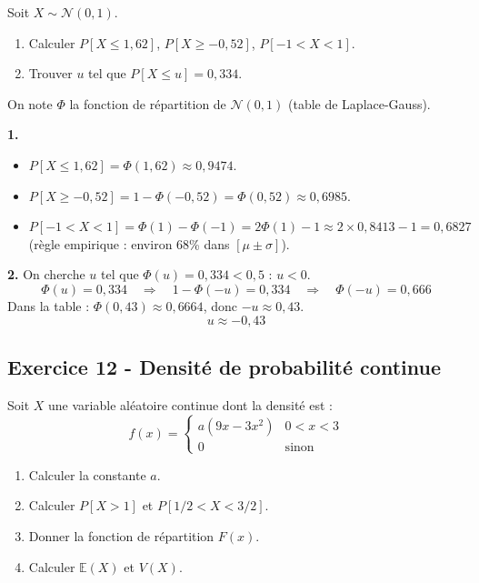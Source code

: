 \documentclass[12pt,a4paper]{article}
\begin{document}
\begin{boiteexercice}
Soit $X \sim \mathcal{N}(0,1)$.
\begin{enumerate}
  \item Calculer $P[X \leq 1{,}62]$, $P[X \geq -0{,}52]$, $P[-1 < X < 1]$.
  \item Trouver $u$ tel que $P[X \leq u] = 0{,}334$.
\end{enumerate}
\end{boiteexercice}

\begin{boitecorrige}
On note $\Phi$ la fonction de répartition de $\mathcal{N}(0,1)$ (table de Laplace-Gauss).

\textbf{1.}
\begin{itemize}[nosep]
  \item $P[X \leq 1{,}62] = \Phi(1{,}62) \approx \boxed{0{,}9474}$.
  \item $P[X \geq -0{,}52] = 1 - \Phi(-0{,}52) = \Phi(0{,}52) \approx \boxed{0{,}6985}$.
  \item $P[-1 < X < 1] = \Phi(1) - \Phi(-1) = 2\Phi(1) - 1 \approx 2\times0{,}8413-1 = \boxed{0{,}6827}$ (règle empirique : environ 68\% dans $[\mu\pm\sigma]$).
\end{itemize}

\textbf{2.} On cherche $u$ tel que $\Phi(u) = 0{,}334 < 0{,}5$ : $u < 0$.
\[
\Phi(u) = 0{,}334 \quad\Rightarrow\quad 1-\Phi(-u) = 0{,}334 \quad\Rightarrow\quad \Phi(-u) = 0{,}666
\]
Dans la table : $\Phi(0{,}43) \approx 0{,}6664$, donc $-u \approx 0{,}43$.
\[
\boxed{u \approx -0{,}43}
\]
\end{boitecorrige}

\subsection*{Exercice 12 - Densité de probabilité continue \niveau{\moyen}}

\begin{boiteexercice}
Soit $X$ une variable aléatoire continue dont la densité est :
\[
f(x) = \begin{cases} a(9x-3x^2) & 0 < x < 3 \\ 0 & \text{sinon} \end{cases}
\]
\begin{enumerate}
  \item Calculer la constante $a$.
  \item Calculer $P[X > 1]$ et $P[1/2 < X < 3/2]$.
  \item Donner la fonction de répartition $F(x)$.
  \item Calculer $\mathbb{E}(X)$ et $V(X)$.
\end{enumerate}
\end{boiteexercice}
\end{document}
